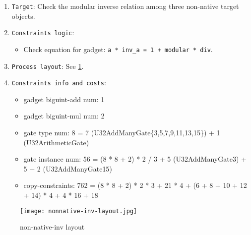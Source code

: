 
\begin{enumerate}
    \item \verb|Target|: Check the modular inverse relation among three non-native target objects.
    \item \verb|Constraints logic|:
    \begin{itemize}
        \item Check equation for gadget: \verb|a * inv_a = 1 + modular * div|.
    \end{itemize}
    \item \verb|Process layout|: See \ref{fig:non-native-inv-layout}.
    \item \verb|Constraints info and costs|:
    \begin{itemize}
        \item gadget biguint-add num: 1
        \item gadget biguint-mul num: 2
        \item gate type num: 8 = 7 (U32AddManyGate\{3,5,7,9,11,13,15\}) + 1 (U32ArithmeticGate)
        \item gate instance num: 56 = (8 * 8 + 2) * 2 / 3 + 5 (U32AddManyGate{3}) + 5 + 2 (U32AddManyGate{15})
        \item copy-constraints: 762 = (8 * 8 + 2) * 2 * 3 + 21 * 4 + (6 + 8 + 10 + 12 + 14) * 4 + 4 * 16 + 18
    \end{itemize}
\end{enumerate}

\begin{figure}[!ht]
    \centering
    \texttt{[image: nonnative-inv-layout.jpg]}
    \caption{non-native-inv layout}
    \label{fig:non-native-inv-layout}
\end{figure}